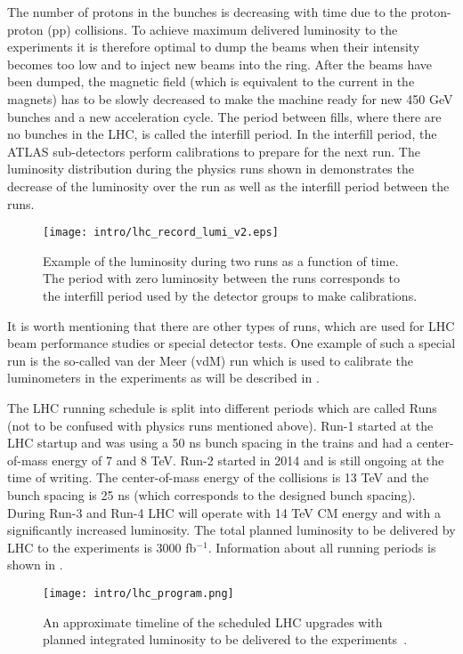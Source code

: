 The number of protons in the bunches is decreasing with time due to the proton-proton (pp) collisions.
To achieve maximum delivered luminosity to the experiments 
it is therefore optimal to dump the beams when their intensity becomes too low and to inject new beams into the ring.
After the beams have been dumped, the magnetic field (which is equivalent to the current in the magnets) has to be slowly decreased to make the machine ready for new 450 GeV bunches and a new acceleration cycle.
The period between fills, where there are no bunches in the LHC, is called the interfill period. In the interfill period, the ATLAS sub-detectors perform calibrations to prepare for the next run. 
The luminosity distribution during the physics runs shown in  demonstrates
the decrease of the luminosity over the run as well as the interfill period between the runs. 

\begin{figure}[]
  \centering
\texttt{[image: intro/lhc\_record\_lumi\_v2.eps]}
\caption{Example of the luminosity during two runs as a function of time. The period with zero luminosity between the runs corresponds to the interfill period used by the detector groups to make calibrations.}
\label{fig:interfill}
\end{figure}


It is worth mentioning that there are other types of runs, which are used for LHC beam performance studies or special detector tests.
One example of such a special run is the so-called van der Meer (vdM) run which is used to calibrate  the luminometers in the experiments as will be described in .

The LHC running schedule is split into different periods which are called Runs (not to be confused with physics runs mentioned above). Run-1 started at the LHC startup and was using a 50 ns bunch spacing in the trains and had a center-of-mass energy of 7 and 8 TeV. 
Run-2 started in 2014 and is still ongoing at the time of writing. The center-of-mass energy of the collisions is 13 TeV and the bunch spacing is 25 ns (which corresponds to the designed bunch spacing).
During Run-3 and Run-4 LHC will operate with 14 TeV CM energy and with a significantly increased luminosity. The total planned luminosity to be delivered by LHC to the experiments is 3000 fb$^{-1}$.
Information about all running periods is shown in .

\begin{figure}[]
  \centering
\texttt{[image: intro/lhc\_program.png]}
\caption{An approximate timeline of the scheduled LHC upgrades with planned integrated luminosity to be delivered to the experiments~\cite{Kawamoto:1552862}.}
\label{fig:lhc_program}
\end{figure}


